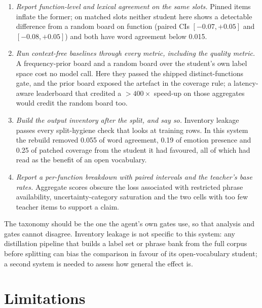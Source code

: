 \begin{enumerate}[leftmargin=1.4em,itemsep=1pt,topsep=2pt,parsep=0pt]

\item \emph{Report function-level and lexical agreement on the same slots.}
Pinned items inflate the former; on matched slots neither student here
shows a detectable difference from a random board on function (paired
CIs $[-0.07,+0.05]$ and $[-0.08,+0.05]$) and both have word agreement
below 0.015.

\item \emph{Run context-free baselines through every metric, including the
quality metric.}
A frequency-prior board and a random board over the student's own label
space cost no model call. Here they passed the shipped distinct-functions
gate, and the prior board exposed the artefact in the coverage rule; a
latency-aware leaderboard that credited a ${>}400\times$ speed-up on
those aggregates would credit the random board too.

\item \emph{Build the output inventory after the split, and say so.}
Inventory leakage passes every split-hygiene check that looks at training
rows. In this system the rebuild removed 0.055 of word agreement, 0.19 of
emotion presence and 0.25 of patched coverage from the student it had
favoured, all of which had read as the benefit of an open vocabulary.

\item \emph{Report a per-function breakdown with paired intervals and the
teacher's base rates.}
Aggregate scores obscure the loss associated with restricted phrase
availability, uncertainty-category saturation and the two cells with too
few teacher items to support a claim.

\end{enumerate}

The taxonomy should be the one the agent's own gates use, so that analysis
and gates cannot disagree. Inventory leakage is not specific to this
system: any distillation pipeline that builds a label set or phrase bank
from the full corpus before splitting can bias the comparison in favour
of its open-vocabulary student; a second system is needed to assess how
general the effect is.

\section{Limitations}

